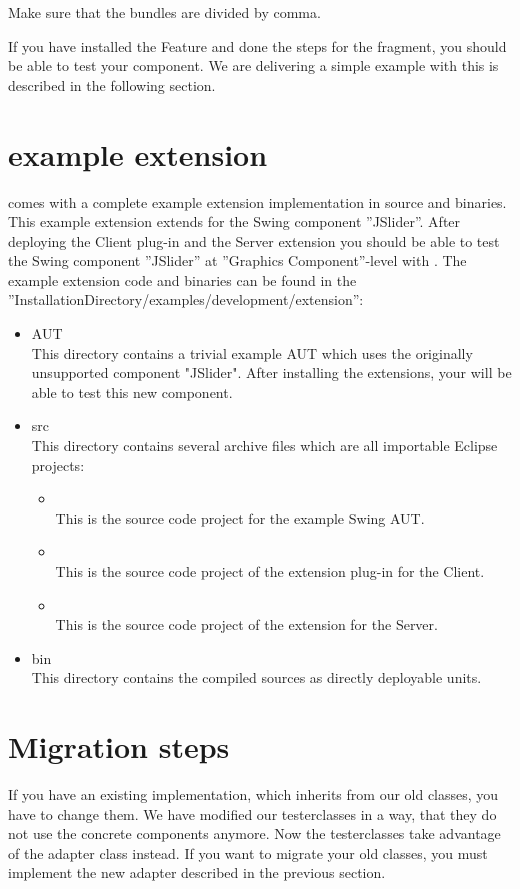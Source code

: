 Make sure that the bundles are divided by comma.

If you have installed the Feature and done the steps for the fragment, you
should be able to test your component. We are delivering a simple example
with \app{} this is described in the following section.

\section{\app{} example extension}
\app{} comes with a complete example extension implementation in source and binaries. 
This example extension extends \app{} for the Swing component ''JSlider''. After deploying the \app{} Client plug-in and the \app{} Server 
extension you should be able to test the Swing component ''JSlider'' at ''Graphics Component''-level with \app{}.
The example extension code and binaries can be found in the ''InstallationDirectory/examples/development/extension'':

\begin{itemize}
 \item AUT \\
 This directory contains a trivial example AUT which uses the originally unsupported component "JSlider". 
 After installing the extensions, your \app{} will be able to test this new component.
 \item src \\
 This directory contains several archive files which are all importable Eclipse projects:
 \begin{itemize}
   \item {} \\
   This is the source code project for the example Swing AUT.
   \item {} \\
   This is the source code project of the extension plug-in for the \app{} Client.
   \item {} \\
   This is the source code project of the extension for the \app{} Server.
 \end{itemize}
 \item bin \\
 This directory contains the compiled sources as directly deployable units.
\end{itemize}

\section{Migration steps}
If you have an existing implementation, which inherits from our old classes,
you have to change them. We have modified our testerclasses in a way, that they
do not use the concrete components anymore. Now the testerclasses take
advantage of the adapter class instead. If you want to migrate your old
classes, you must implement the new adapter described in the previous section.
